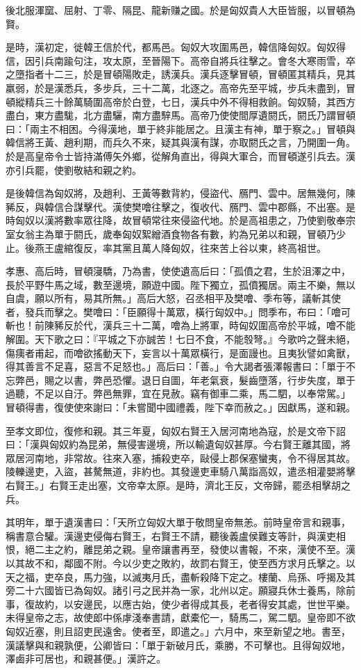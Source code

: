 \begin{pinyinscope}
後北服渾窳、屈射、丁零、隔昆、龍新赚之國。於是匈奴貴人大臣皆服，以冒頓為賢。

是時，漢初定，徙韓王信於代，都馬邑。匈奴大攻圍馬邑，韓信降匈奴。匈奴得信，因引兵南踰句注，攻太原，至晉陽下。高帝自將兵往擊之。會冬大寒雨雪，卒之墮指者十二三，於是冒頓陽敗走，誘漢兵。漢兵逐擊冒頓，冒頓匿其精兵，見其羸弱，於是漢悉兵，多步兵，三十二萬，北逐之。高帝先至平城，步兵未盡到，冒頓縱精兵三十餘萬騎圍高帝於白登，七日，漢兵中外不得相救餉。匈奴騎，其西方盡白，東方盡駹，北方盡驪，南方盡騂馬。高帝乃使使間厚遺閼氏，閼氏乃謂冒頓曰：「兩主不相困。今得漢地，單于終非能居之。且漢主有神，單于察之。」冒頓與韓信將王黃、趙利期，而兵久不來，疑其與漢有謀，亦取閼氏之言，乃開圍一角。於是高皇帝令士皆持滿傅矢外鄉，從解角直出，得與大軍合，而冒頓遂引兵去。漢亦引兵罷，使劉敬結和親之約。

是後韓信為匈奴將，及趙利、王黃等數背約，侵盜代、鴈門、雲中。居無幾何，陳豨反，與韓信合謀擊代。漢使樊噲往擊之，復收代、鴈門、雲中郡縣，不出塞。是時匈奴以漢將數率眾往降，故冒頓常往來侵盜代地。於是高祖患之，乃使劉敬奉宗室女翁主為單于閼氏，歲奉匈奴絮繒酒食物各有數，約為兄弟以和親，冒頓乃少止。後燕王盧綰復反，率其黨且萬人降匈奴，往來苦上谷以東，終高祖世。

孝惠、高后時，冒頓寖驕，乃為書，使使遺高后曰：「孤僨之君，生於沮澤之中，長於平野牛馬之域，數至邊境，願遊中國。陛下獨立，孤僨獨居。兩主不樂，無以自虞，願以所有，易其所無。」高后大怒，召丞相平及樊噲、季布等，議斬其使者，發兵而擊之。樊噲曰：「臣願得十萬眾，橫行匈奴中。」問季布，布曰：「噲可斬也！前陳豨反於代，漢兵三十二萬，噲為上將軍，時匈奴圍高帝於平城，噲不能解圍。天下歌之曰：『平城之下亦誠苦！七日不食，不能彀弩。』今歌吟之聲未絕，傷痍者甫起，而噲欲搖動天下，妄言以十萬眾橫行，是面謾也。且夷狄譬如禽獸，得其善言不足喜，惡言不足怒也。」高后曰：「善。」令大謁者張澤報書曰：「單于不忘弊邑，賜之以書，弊邑恐懼。退日自圖，年老氣衰，髮齒墮落，行步失度，單于過聽，不足以自汙。弊邑無罪，宜在見赦。竊有御車二乘，馬二駟，以奉常駕。」冒頓得書，復使使來謝曰：「未嘗聞中國禮義，陛下幸而赦之。」因獻馬，遂和親。

至孝文即位，復修和親。其三年夏，匈奴右賢王入居河南地為寇，於是文帝下詔曰：「漢與匈奴約為昆弟，無侵害邊境，所以輸遺匈奴甚厚。今右賢王離其國，將眾居河南地，非常故。往來入塞，捕殺吏卒，敺侵上郡保塞蠻夷，令不得居其故。陵轢邊吏，入盜，甚驁無道，非約也。其發邊吏車騎八萬詣高奴，遣丞相灌嬰將擊右賢王。」右賢王走出塞，文帝幸太原。是時，濟北王反，文帝歸，罷丞相擊胡之兵。

其明年，單于遺漢書曰：「天所立匈奴大單于敬問皇帝無恙。前時皇帝言和親事，稱書意合驩。漢邊吏侵侮右賢王，右賢王不請，聽後義盧侯難支等計，與漢吏相恨，絕二主之約，離昆弟之親。皇帝讓書再至，發使以書報，不來，漢使不至。漢以其故不和，鄰國不附。今以少吏之敗約，故罰右賢王，使至西方求月氏擊之。以天之福，吏卒良，馬力強，以滅夷月氏，盡斬殺降下定之。樓蘭、烏孫、呼揭及其旁二十六國皆已為匈奴。諸引弓之民并為一家，北州以定。願寢兵休士養馬，除前事，復故約，以安邊民，以應古始，使少者得成其長，老者得安其處，世世平樂。未得皇帝之志，故使郎中係虖淺奉書請，獻橐佗一，騎馬二，駕二駟。皇帝即不欲匈奴近塞，則且詔吏民遠舍。使者至，即遣之。」六月中，來至新望之地。書至，漢議擊與和親孰便，公卿皆曰：「單于新破月氏，乘勝，不可擊也。且得匈奴地，澤鹵非可居也，和親甚便。」漢許之。


\end{pinyinscope}
